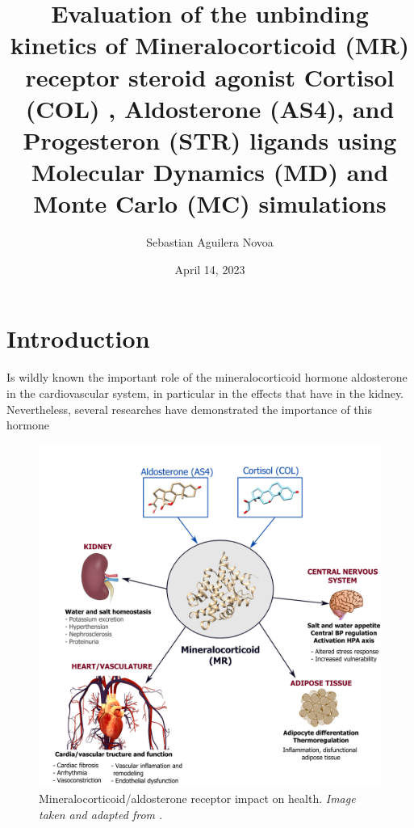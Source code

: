 \documentclass[letter,10pt, twocolumn]{article}
\title{Evaluation of the unbinding kinetics of Mineralocorticoid (MR) receptor steroid agonist Cortisol (COL) , Aldosterone (AS4), and Progesteron (STR) ligands using Molecular Dynamics (MD) and Monte Carlo (MC) simulations}
\author{Sebastian Aguilera Novoa}
\date{April 14, 2023}
\begin{document}




\section{Introduction}


Is wildly known the important role of the mineralocorticoid hormone aldosterone in the cardiovascular system, in particular in the effects that have in the kidney. Nevertheless, several researches have demonstrated the importance of this hormone \cite{book-MR_AS4, MR-as4_importance}


\cite{Activating_Mineralocorticoid}


\begin{figure}[h]
\hspace*{-25pt}   
\includegraphics[scale=0.35]{MR-AS4-COL.png}
\caption{Mineralocorticoid/aldosterone receptor impact on health. \textit{Image taken and adapted from \cite{book-MR_AS4}.}}
\label{MR_functions}
\end{figure}
\end{document}
